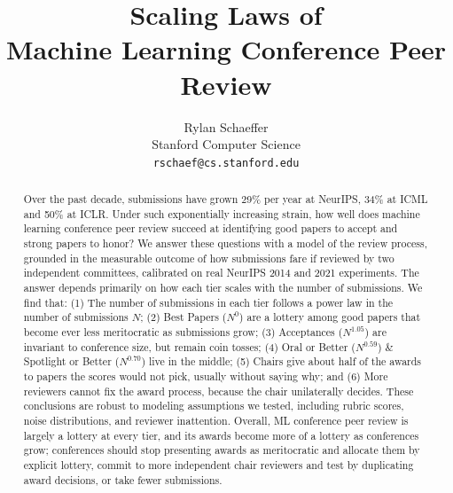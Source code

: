 \documentclass{article}
\title{Scaling Laws of\\Machine Learning Conference Peer Review}
\author{%
  Rylan Schaeffer \\
  Stanford Computer Science \\
  \texttt{rschaef@cs.stanford.edu}
}
\begin{document}
\maketitle

\begin{abstract}
Over the past decade, submissions have grown 29\% per year at NeurIPS, 34\% at ICML and 50\% at ICLR.
Under such exponentially increasing strain, how well does machine learning conference peer review succeed at identifying good papers to accept and strong papers to honor?
We answer these questions with a model of the review process, grounded in the measurable outcome of how submissions fare if reviewed by two independent committees, calibrated on real NeurIPS 2014 and 2021 experiments.
The answer depends primarily on how each tier scales with the number of submissions.
We find that: (1) The number of submissions in each tier follows a power law in the number of submissions $N$; (2) Best Papers ($N^0$) are a lottery among good papers that become ever less meritocratic as submissions grow; (3) Acceptances ($N^{1.05}$) are invariant to conference size, but remain coin tosses; (4) Oral or Better ($N^{0.59}$) \& Spotlight or Better ($N^{0.70}$) live in the middle; (5) Chairs give about half of the awards to papers the scores would not pick, usually without saying why; and (6) More reviewers cannot fix the award process, because the chair unilaterally decides.
These conclusions are robust to modeling assumptions we tested, including rubric scores, noise distributions, and reviewer inattention.
Overall, ML conference peer review is largely a lottery at every tier, and its awards become more of a lottery as conferences grow; conferences should stop presenting awards as meritocratic and allocate them by explicit lottery, commit to more independent chair reviewers and test by duplicating award decisions, or take fewer submissions.
\end{abstract}
\end{document}
